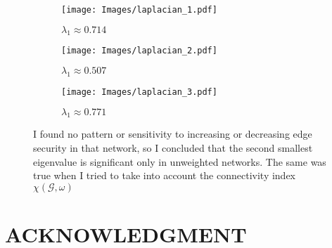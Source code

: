 \documentclass[letterpaper, 10 pt, conference]{ieeeconf}  %
\begin{document}
\begin{figure}[h!]
\small
  \centering
  \begin{subfigure}[1_1]{0.3\linewidth}
    \texttt{[image: Images/laplacian\_1.pdf]}
     \caption{$\lambda_{1} \approx 0.714$}
  \end{subfigure}
  \begin{subfigure}[2_1]{0.3\linewidth}
    \texttt{[image: Images/laplacian\_2.pdf]}
    \caption{$\lambda_{1} \approx 0.507$}
  \end{subfigure}
  \begin{subfigure}[3_1]{0.3\linewidth}
    \texttt{[image: Images/laplacian\_3.pdf]}
    \caption{$\lambda_{1} \approx 0.771$}
  \end{subfigure}
  \caption{I found no pattern or sensitivity to increasing or decreasing edge security in that network, so I concluded that the second smallest eigenvalue is significant only in unweighted networks. The same was true when I tried to take into account the connectivity index $\chi(\mathcal{G}, \omega)$ \cite{araujo1998connectivity}}
  \label{Laplacian}
\end{figure}

\section*{ACKNOWLEDGMENT}










\end{document}
